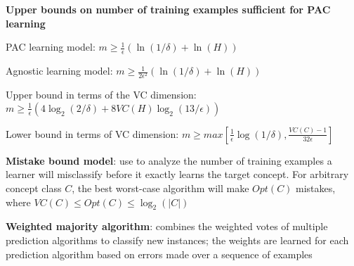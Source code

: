 \documentclass[letterpaper,fontsize=5pt]{scrartcl}
\renewenvironment{enumerate}[1]{\begin{compactenum}#1}{\end{compactenum}}
\theoremstyle{definition}
\newcommand{\abs}[1]{\lvert#1\rvert}
\begin{document}
\begin{multicols}{2}
\begin{enumerate}
		\item \textbf{Upper bounds on number of training examples sufficient for PAC learning}
			\begin{enumerate}
				\item PAC learning model: $m \geq \frac{1}{\epsilon}(\ln(1/\delta) + \ln(H))$
				\item Agnostic learning model: $m \geq \frac{1}{2\epsilon^2} (\ln(1/\delta) + \ln(H))$
				\item Upper bound in terms of the VC dimension: $m \geq \frac{1}{\epsilon} (4\log_{2}(2/\delta) + 8VC(H) \log_{2}(13/\epsilon))$
				\item Lower bound in terms of VC dimension: $m \geq max [\frac{1}{\epsilon} \log(1/\delta), \frac{VC(C)-1}{32\epsilon}]$
			\end{enumerate}
		\item \textbf{Mistake bound model}: use to analyze the number of training examples a learner will misclassify before it exactly learns the target concept. For arbitrary concept class $C$, the best worst-case algorithm will make $Opt(C)$ mistakes, where $VC(C) \leq Opt(C) \leq \log_{2}(\abs{C})$
		\item \textbf{Weighted majority algorithm}: combines the weighted votes of multiple prediction algorithms to classify new instances; the weights are learned for each prediction algorithm based on errors made over a sequence of examples
	\end{enumerate}\

\end{multicols}
\end{document}
